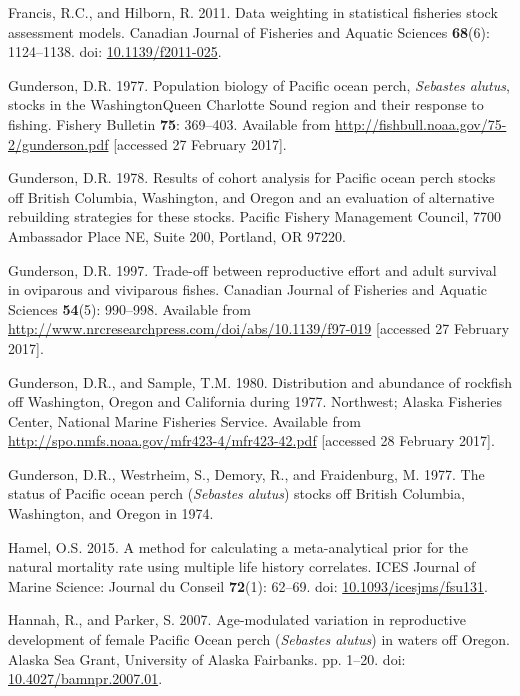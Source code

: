 \documentclass[12pt,]{article}
\begin{document}
\hypertarget{ref-francis_data_2011}{}
Francis, R.C., and Hilborn, R. 2011. Data weighting in statistical
fisheries stock assessment models. Canadian Journal of Fisheries and
Aquatic Sciences \textbf{68}(6): 1124--1138. doi:
\href{https://doi.org/10.1139/f2011-025}{10.1139/f2011-025}.

\hypertarget{ref-gunderson_population_1977}{}
Gunderson, D.R. 1977. Population biology of Pacific ocean perch,
\emph{Sebastes alutus}, stocks in the WashingtonQueen Charlotte Sound
region and their response to fishing. Fishery Bulletin \textbf{75}:
369--403. Available from
\url{http://fishbull.noaa.gov/75-2/gunderson.pdf} {[}accessed 27
February 2017{]}.

\hypertarget{ref-gunderson_results_1978}{}
Gunderson, D.R. 1978. Results of cohort analysis for Pacific ocean perch
stocks off British Columbia, Washington, and Oregon and an evaluation of
alternative rebuilding strategies for these stocks. Pacific Fishery
Management Council, 7700 Ambassador Place NE, Suite 200, Portland, OR
97220.

\hypertarget{ref-gunderson_trade-off_1997}{}
Gunderson, D.R. 1997. Trade-off between reproductive effort and adult
survival in oviparous and viviparous fishes. Canadian Journal of
Fisheries and Aquatic Sciences \textbf{54}(5): 990--998. Available from
\url{http://www.nrcresearchpress.com/doi/abs/10.1139/f97-019}
{[}accessed 27 February 2017{]}.

\hypertarget{ref-gunderson_distribution_1980}{}
Gunderson, D.R., and Sample, T.M. 1980. Distribution and abundance of
rockfish off Washington, Oregon and California during 1977. Northwest;
Alaska Fisheries Center, National Marine Fisheries Service. Available
from \url{http://spo.nmfs.noaa.gov/mfr423-4/mfr423-42.pdf} {[}accessed
28 February 2017{]}.

\hypertarget{ref-gunderson_status_1977}{}
Gunderson, D.R., Westrheim, S., Demory, R., and Fraidenburg, M. 1977.
The status of Pacific ocean perch (\emph{Sebastes alutus}) stocks off
British Columbia, Washington, and Oregon in 1974.

\hypertarget{ref-hamel_method_2015}{}
Hamel, O.S. 2015. A method for calculating a meta-analytical prior for
the natural mortality rate using multiple life history correlates. ICES
Journal of Marine Science: Journal du Conseil \textbf{72}(1): 62--69.
doi:
\href{https://doi.org/10.1093/icesjms/fsu131}{10.1093/icesjms/fsu131}.

\hypertarget{ref-hannah_age-modulated_2007}{}
Hannah, R., and Parker, S. 2007. Age-modulated variation in reproductive
development of female Pacific Ocean perch (\emph{Sebastes alutus}) in
waters off Oregon. Alaska Sea Grant, University of Alaska Fairbanks. pp.
1--20. doi:
\href{https://doi.org/10.4027/bamnpr.2007.01}{10.4027/bamnpr.2007.01}.
\end{document}

